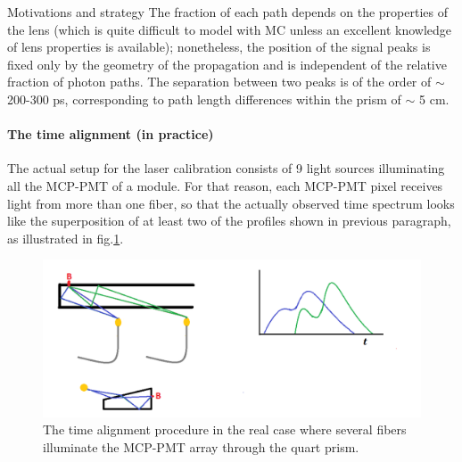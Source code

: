 \documentclass[a4paper,11pt]{article}
\begin{document}
\begin{subsection}{Motivations and strategy}
The fraction of each path depends on the properties of the lens (which is quite difficult to model with MC unless an excellent knowledge of lens properties is available); nonetheless, the position of the signal peaks is fixed only by the geometry of the propagation and is independent of the relative fraction of photon paths. The separation between two peaks is of the order of $\sim$ 200-300 ps, corresponding to path length differences within the prism of $\sim$ 5 cm. 


\paragraph{The time alignment (in practice)} The actual setup for the laser calibration consists of 9 light sources illuminating all the MCP-PMT of a module. For that reason, each MCP-PMT pixel receives light from more than one fiber, so that the actually observed time spectrum looks like the superposition of at least two of the profiles shown in previous paragraph, as illustrated in fig.\ref{fig:cal3}.


\begin{figure}
\centering
\begin{minipage}{1\textwidth}
\includegraphics[width=\textwidth]{pictures/calibration_iii}
\caption{The time alignment procedure in the real case where several fibers illuminate the MCP-PMT array through the quart prism.}
\label{fig:cal3}
\end{minipage}
\end{figure}




\end{subsection}
\end{document}
